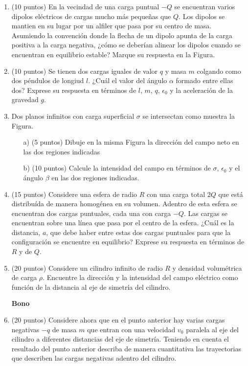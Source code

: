 \documentclass{article}
\begin{document}
\begin{enumerate}
\item (10 puntos) En la vecindad de
  una carga puntual $-Q$ se encuentran varios dipolos eléctricos de
  cargas mucho más pequeñas que $Q$. Los dipolos se mantien en su
  lugar por un alfiler que pasa por su centro de masa. Asumiendo la convenci\'on donde
  la flecha de un dipolo apunta  de la carga positiva a la carga
  negativa, ¿cómo se deber\'ian alinear los dipolos cuando se
  encuentran en equilibrio estable? Marque su respuesta en la Figura.

\item (10 puntos) Se tienen dos cargas iguales de valor $q$ y masa
  $m$ colgando como dos p\'endulos de longiud $l$. ¿Cuál el valor del
  ángulo $\alpha$ formado entre ellas dos? Exprese su respuesta en
  t\'erminos de $l$, $m$, $q$, $\epsilon_0$ y  la aceleraci\'on de la
  gravedad $g$. 

\item Dos planos infinitos con carga superficial $\sigma$
  se intersectan como muestra la Figura. 
  \begin{enumerate}
\item[a)] (5 puntos) Dibuje en la misma Figura la
  direcci\'on del campo neto en las dos regiones indicadas 
\item[b)] (10 puntos) Calcule la intensidad del campo en t\'erminos de $\sigma$,
  $\epsilon_0$ y el \'angulo $\beta$ en las dos regiones indicadas.
\end{enumerate}

\item (15 puntos) Considere una esfera de radio $R$ con una carga total $2Q$ que
  est\'a distribu\'ida de manera homog\'enea en su volumen. Adentro de esta esfera
  se encuentran dos cargas puntuales, cada una con carga $-Q$. Las
  cargas se encuentran sobre una l\'inea que pasa por el centro de la
  esfera. ¿Cuál es la distancia, $a$, que debe haber entre estas dos cargas
  puntuales para que la configuración se encuentre en equilibrio?
  Exprese su respuesta en t\'erminos de $R$ y de $Q$.

\item (20 puntos) Considere un cilindro infinito de radio $R$ y
  densidad volum\'etrica de carga $\rho$. Encuentre la direcci\'on y
  la intensidad del campo el\'ectrico como funci\'on de la distancia
  al eje de simetr\'ia del cilindro.

{\bf Bono}

\item (20 puntos) Considere ahora que en el punto anterior hay varias
  cargas negativas $-q$ de masa $m$ que entran con una velocidad $v_0$
  paralela al eje del cilindro a diferentes distancias del eje de
  simetr\'ia. Teniendo en cuenta el resultado del punto anterior
  describa de manera cuantitativa las trayectorias que describen las
  cargas negativas adentro del cilindro.  


\end{enumerate}



\end{document}
